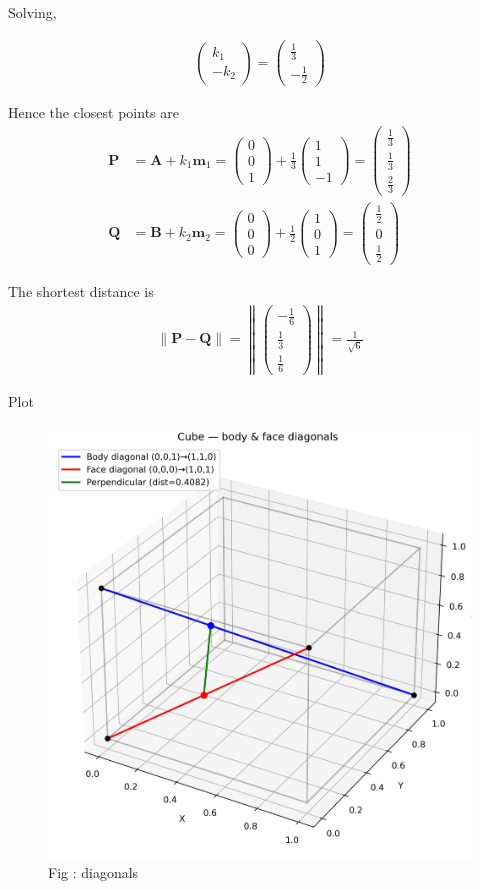 \documentclass{beamer}
\numberwithin{equation}{section}
\theoremstyle{remark}
\newcommand{\myvec}[1]{\ensuremath{\begin{pmatrix}#1\end{pmatrix}}}
\let\vec\mathbf
\begin{document}
\begin{frame}

Solving,

\begin{align}
  \myvec{k_1\\-k_2} = \myvec{\frac{1}{3} \\[5pt] -\frac{1}{2}}
\end{align}

Hence the closest points are
\begin{align}
\vec{P} &= \vec{A} + k_1\vec{m}_1 
= \myvec{0\\0\\1} + \tfrac{1}{3}\myvec{1\\1\\-1}
= \myvec{\frac{1}{3}\\[5pt] \frac{1}{3}\\[5pt] \frac{2}{3}} \\
\vec{Q} &= \vec{B} + k_2\vec{m}_2 
= \myvec{0\\0\\0} + \tfrac{1}{2}\myvec{1\\0\\1}
= \myvec{\frac{1}{2}\\[5pt] 0\\[5pt] \tfrac{1}{2}}
\end{align}

The shortest distance is
\begin{align}
  \|\vec{P}-\vec{Q}\|
  = \left\|\myvec{-\frac{1}{6}\\[5pt] \tfrac{1}{3}\\[5pt] \tfrac{1}{6}}\right\| = \frac{1}{\sqrt{6}}
\end{align}

 \end{frame}

\begin{frame}{Plot}

\begin{figure}[h!]
  \centering
  \includegraphics[width=0.6\columnwidth]{figs/cube_lines.png} 
   \caption*{Fig : diagonals}
  \label{Fig1}
\end{figure}
   
\end{frame}
\end{document}
